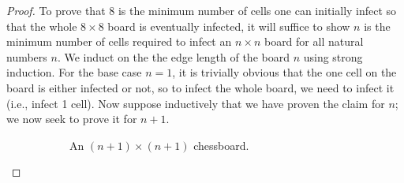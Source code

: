 \documentclass[../apprentice.tex]{subfiles}
\begin{document}
\begin{enumerate}
    \begin{proof}
        To prove that 8 is the minimum number of cells one can initially infect so that the whole $8\times 8$ board is eventually infected, it will suffice to show $n$ is the minimum number of cells required to infect an $n\times n$ board for all natural numbers $n$. We induct on the the edge length of the board $n$ using strong induction. For the base case $n=1$, it is trivially obvious that the one cell on the board is either infected or not, so to infect the whole board, we need to infect it (i.e., infect 1 cell). Now suppose inductively that we have proven the claim for $n$; we now seek to prove it for $n+1$.\par
        \begin{figure}[h!]
            \centering
            \begin{subfigure}[b]{0.3\linewidth}
                \centering
                \caption{An $(n+1)\times(n+1)$ chessboard.}
                \label{fig:chessboarda}
            \end{subfigure}
            \begin{subfigure}[b]{0.3\linewidth}
                \centering
\end{subfigure}
\end{figure}
\end{proof}
\end{enumerate}
\end{document}
